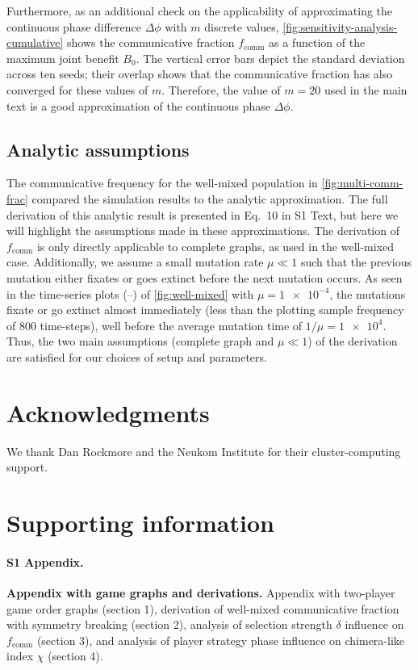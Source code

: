 \documentclass[10pt,letterpaper]{article}
\begin{document}
Furthermore, as an additional check on the applicability
of approximating the continuous phase difference $\Delta \phi$
with $m$ discrete values,
\cref{fig:sensitivity-analysis-cumulative}
shows the communicative fraction $f_{\text{comm}}$
as a function of the maximum joint benefit $B_0$.
The vertical error bars depict the standard deviation across ten seeds;
their overlap shows that the communicative fraction has also converged
for these values of $m$.
Therefore, the value of $m=20$ used in the main text is a good
approximation of the continuous phase $\Delta \phi$.

\subsection{Analytic assumptions}\label{sec:analytic-assumptions}
The communicative frequency
for the well-mixed population
in \cref{fig:multi-comm-frac} compared the simulation results to the
analytic approximation.
The full derivation of this analytic result is presented in
Eq.\ 10 in S1 Text,
but here we will highlight the assumptions made in these approximations.
The derivation of $f_{\text{comm}}$ is only directly applicable to
complete graphs, as used in the well-mixed case.
Additionally, we assume a small mutation rate $\mu \ll 1$
such that the previous mutation either fixates or goes extinct before
the next mutation occurs.
As seen in the time-series plots
(--)
of \cref{fig:well-mixed} with $\mu = \num{1e-4}$,
the mutations fixate or go extinct almost immediately (less than the plotting
sample frequency of 800 time-steps),
well before the average mutation time of $1/\mu = \num{1e4}$.
Thus, the two main assumptions (complete graph and $\mu \ll 1$)
of the derivation are satisfied for our choices of setup and parameters.

\section*{Acknowledgments}
We thank Dan Rockmore and the Neukom Institute for their
cluster-computing support.

\section*{Supporting information}

\paragraph*{S1 Appendix.}
\textbf{Appendix with game graphs and derivations.}
Appendix with two-player game order graphs (section 1),
derivation of well-mixed communicative fraction
with symmetry breaking (section 2),
analysis of selection strength $\delta$ influence on $f_{\text{comm}}$
(section 3),
and
analysis of player strategy \vs{} phase influence
on chimera-like index $\chi$ (section 4).
\end{document}
